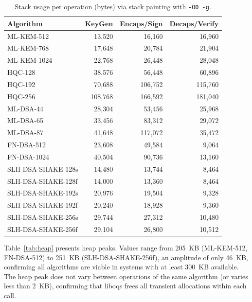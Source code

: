 \documentclass[12pt]{article}
\begin{document}
\begin{table}[htbp]
\centering
\caption{Stack usage per operation (bytes) via stack painting with \texttt{-O0 -g}.}
\label{tab:stack}
\small
\begin{tabular}{lrrr}
\hline
\textbf{Algorithm} & \textbf{KeyGen} & \textbf{Encaps/Sign} & \textbf{Decaps/Verify} \\
\hline
ML-KEM-512    &  13,520 &  16,160 &  16,960 \\
ML-KEM-768    &  17,648 &  20,784 &  21,904 \\
ML-KEM-1024   &  22,768 &  26,448 &  28,048 \\
HQC-128       &  38,576 &  56,448 &  60,896 \\
HQC-192       &  70,688 & 106,752 & 115,760 \\
HQC-256       & 108,768 & 166,592 & 181,040 \\
\hline
ML-DSA-44     &  28,304 &  53,456 &  25,968 \\
ML-DSA-65     &  33,456 &  83,312 &  29,072 \\
ML-DSA-87     &  41,648 & 117,072 &  35,472 \\
FN-DSA-512    &  23,608 &  49,584 &   9,064 \\
FN-DSA-1024   &  40,504 &  90,736 &  13,160 \\
SLH-DSA-SHAKE-128s &  14,480 &  13,744 &   8,464 \\
SLH-DSA-SHAKE-128f &  14,000 &  13,360 &   8,464 \\
SLH-DSA-SHAKE-192s &  20,976 &  19,504 &   9,328 \\
SLH-DSA-SHAKE-192f &  20,240 &  18,928 &   9,360 \\
SLH-DSA-SHAKE-256s &  29,744 &  27,312 &  10,480 \\
SLH-DSA-SHAKE-256f &  29,104 &  26,800 &  10,512 \\
\hline
\end{tabular}
\end{table}

Table~\ref{tab:heap} presents heap peaks. Values range from 205~KB
(ML-KEM-512, FN-DSA-512) to 251~KB (SLH-DSA-SHAKE-256f), an amplitude of
only 46~KB, confirming all algorithms are viable in systems with at least
300~KB available. The heap peak does not vary between operations of the same
algorithm (or varies less than 2~KB), confirming that liboqs frees all
transient allocations within each call.
\end{document}
